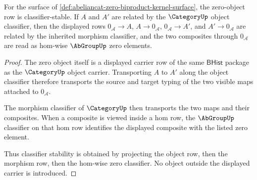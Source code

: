 \begin{theorem}
\label{thm:abeliancat-zero-object-obligation}
For the surface of
\autoref{def:abeliancat-zero-biproduct-kernel-surface}, the zero-object row is
classifier-stable. If $A$ and $A'$ are related by the $\CategoryUp$
object classifier, then the displayed rows $0_{\mathcal A}\to A$,
$A\to 0_{\mathcal A}$, $0_{\mathcal A}\to A'$, and
$A'\to 0_{\mathcal A}$ are related by the inherited morphism classifier, and
the two composites through $0_{\mathcal A}$ are read as hom-wise
$\AbGroupUp$ zero elements.
\end{theorem}
\begin{proof}
The zero object itself is a displayed carrier row of the same
$\mathsf{BHist}$ package as the $\CategoryUp$ object carrier. Transporting
$A$ to $A'$ along the object classifier therefore transports the source and
target typing of the two visible maps attached to $0_{\mathcal A}$.

The morphism classifier of $\CategoryUp$ then transports the two maps and
their composites. When a composite is viewed inside a hom row, the
$\AbGroupUp$ classifier on that hom row identifies the displayed composite
with the listed zero element.

Thus classifier stability is obtained by projecting the object row, then the
morphism row, then the hom-wise zero classifier. No object outside the
displayed carrier is introduced.
\end{proof}


